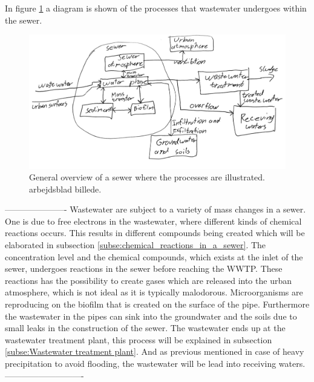 In figure \ref{fig:sewer_overview_of_the_chemical_process} a diagram is shown of the processes that wastewater undergoes within the sewer.
\begin{figure}[H]
\centering
\includegraphics[width=1\textwidth]{report/introduction/pictures/detailed_sewer.pdf}
\caption{General overview of a sewer where the processes are illustrated. arbejdsblad billede. }
\label{fig:sewer_overview_of_the_chemical_process}
\end{figure}

---------------------- 
Wastewater are subject to a variety of mass changes in a sewer. One is due to free electrons in the wastewater, where different kinds of chemical reactions occurs. This results in different compounds being created which will be elaborated in subsection \ref{subse:chemical_reactions_in_a_sewer}. The concentration level and the chemical compounds, which exists at the inlet of the sewer, undergoes reactions in the sewer before reaching the WWTP. These reactions has the possibility to create gases which are released into the urban atmosphere, which is not ideal as it is typically malodorous. %
Microorganisms are reproducing on the biofilm that is created on the surface of the pipe. Furthermore the wastewater in the pipes can sink into the groundwater and the soils due to small leaks in the construction of the sewer. The wastewater ends up at the wastewater treatment plant, this process will be explained in subsection \ref{subse:Wastewater treatment plant}. And as previous mentioned in case of heavy precipitation to avoid flooding, the wastewater will be lead into receiving waters. 
----------------------------

